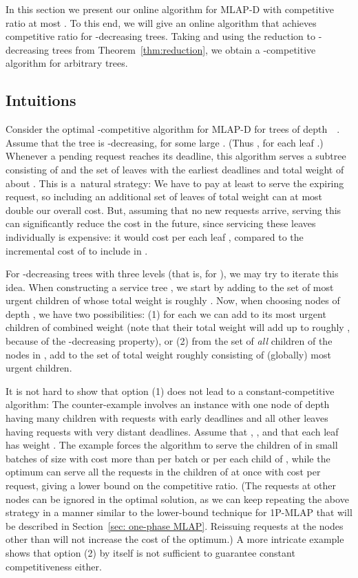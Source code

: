 \documentclass[a4paper]{article}
\newcommand{\MLAPD}{\mbox{\rm\textsf{MLAP-D}}}
\newcommand{\SPMLAP}{\mbox{\rm\textsf{1P-MLAP}}}
\begin{document}
In this section we present our online algorithm for {\MLAPD} with 
competitive ratio at most .
To this end, we will give an online algorithm that achieves
competitive ratio  for -decreasing trees.
Taking  and using the reduction to -decreasing trees from
Theorem~\ref{thm:reduction}, we obtain a
-competitive algorithm for arbitrary trees.


\subsection{Intuitions} 

Consider the optimal -competitive algorithm for {\MLAPD} for
trees of depth~~\cite{jrp-soda-2014}. Assume that the tree is -decreasing, 
for some large . (Thus , for each leaf .)
Whenever a pending request
reaches its deadline, this algorithm serves a subtree  consisting
of  and the set of leaves with the earliest deadlines and total
weight of about .  This is a~natural strategy: We
have to pay at least  to serve the expiring request, so
including an additional set of leaves of total weight  can
at most double our overall cost. But, assuming that no new requests arrive,
serving this  can significantly reduce the cost in the future,
since servicing these leaves individually is expensive: it would
cost  per each leaf , compared to the
incremental cost of  to include  in .

For -decreasing trees with three levels (that is, for ), 
we may try to iterate this idea. 
When constructing a service tree , we start by adding to 
the set of most urgent children of  whose total weight is roughly
.  Now, when choosing nodes of depth , we have two
possibilities: (1) for each  we can add to 
its most urgent children of combined weight  (note that
their total weight will add up to roughly , because of the
-decreasing property), or (2) from the set of \emph{all} children
of the nodes in , add to  the set of total weight
roughly  consisting of (globally) most urgent children. 

It is not hard to show that option (1) does not lead to a
constant-competitive algorithm: The counter-example involves an
instance with one node  of depth  having many children with
requests with early deadlines and all other leaves having requests
with very distant deadlines. Assume that ,
, and that each leaf has weight . 
The example forces the
algorithm to serve the children of  in small batches of size 
with cost more than  per batch or  per each child of , while the
optimum can serve all the requests in the children of  at once with cost  per
request, giving a lower bound  on the competitive ratio.
(The requests at other nodes can be ignored in the optimal
solution, as we can keep repeating the above strategy in a manner
similar to the lower-bound technique for {\SPMLAP}
that will be described in Section~\ref{sec: one-phase MLAP}.
Reissuing requests at the 
nodes other than  will not increase the cost of the optimum.) 
A more intricate example
shows that option (2) by itself is not sufficient to guarantee
constant competitiveness either.
\end{document}
